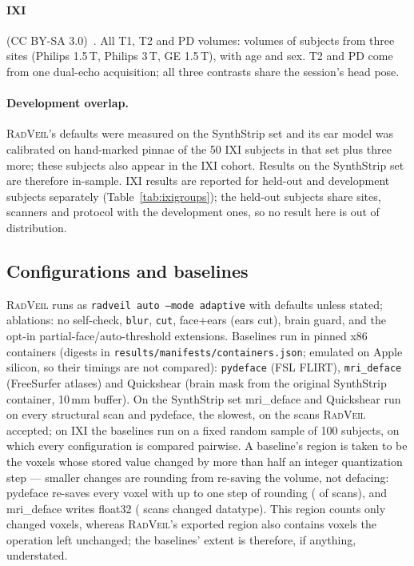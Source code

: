 \documentclass[11pt]{article}
\newcommand{\rv}{\textsc{RadVeil}}
\newcommand{\code}[1]{\texttt{#1}}
\begin{document}
\paragraph{IXI} (CC BY-SA 3.0)~\cite{ixi}. All T1, T2 and PD volumes:
\ixiVolumes{} volumes of \ixiSubjects{} subjects from three sites (Philips
1.5\,T, Philips 3\,T, GE 1.5\,T), with age and sex. T2 and PD come from one
dual-echo acquisition; all three contrasts share the session's head pose.

\paragraph{Development overlap.} \rv{}'s defaults were measured on the
SynthStrip set and its ear model was calibrated on hand-marked pinnae of
the 50 IXI subjects in that set plus three more; these \ixiDevSubjects{}
subjects also appear in the IXI cohort. Results on the SynthStrip set are
therefore in-sample. IXI results are reported for held-out and development
subjects separately (Table~\ref{tab:ixigroups}); the held-out subjects share
sites, scanners and protocol with the development ones, so no result here is
out of distribution.

\subsection{Configurations and baselines}
\rv{} runs as \code{radveil auto --mode adaptive} with defaults unless
stated; ablations: no self-check, \code{blur}, \code{cut}, face+ears (ears
cut), brain guard, and the opt-in partial-face/auto-threshold extensions.
Baselines run in pinned x86 containers (digests in
\code{results/manifests/containers.json}; emulated on Apple silicon, so their
timings are not compared): \code{pydeface} (FSL FLIRT), \code{mri\_deface}
(FreeSurfer atlases) and Quickshear (brain mask from the original SynthStrip
container, 10\,mm buffer). On the SynthStrip set mri\_deface and Quickshear
run on every structural scan and pydeface, the slowest, on the scans \rv{}
accepted; on IXI the baselines run on a fixed random sample of 100 subjects,
on which every configuration is compared pairwise. A baseline's region is
taken to be the voxels whose stored value changed by more than half an
integer quantization step --- smaller changes are rounding from re-saving
the volume, not defacing: pydeface re-saves every voxel with up to one step
of rounding (\requantPydefaceScans{} of \requantPydefaceN{} scans), and
mri\_deface writes float32 (\dtypeMriDefaceChanged{} scans changed
datatype). This region counts
only changed voxels, whereas \rv{}'s exported region also contains voxels the
operation left unchanged; the baselines' extent is therefore, if anything,
understated.
\end{document}
